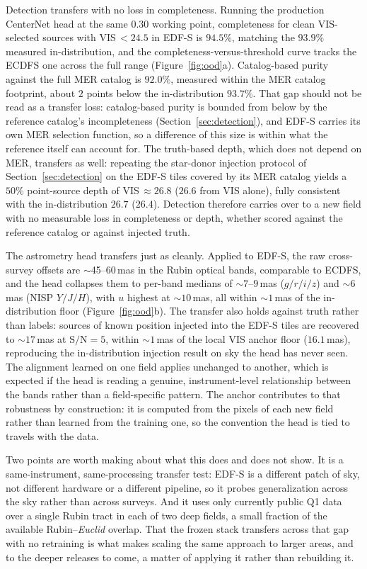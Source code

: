 \documentclass[twocolumn,linenumbers]{aastex701}
\begin{document}
Detection transfers with no loss in completeness. Running the production CenterNet head at the same $0.30$ working point, completeness for clean VIS-selected sources with VIS\,$<24.5$ in EDF-S is $94.5\%$, matching the $93.9\%$ measured in-distribution, and the completeness-versus-threshold curve tracks the ECDFS one across the full range (Figure~\ref{fig:ood}a). Catalog-based purity against the full MER catalog is $92.0\%$, measured within the MER catalog footprint, about $2$ points below the in-distribution $93.7\%$. That gap should not be read as a transfer loss: catalog-based purity is bounded from below by the reference catalog's incompleteness (Section~\ref{sec:detection}), and EDF-S carries its own MER selection function, so a difference of this size is within what the reference itself can account for. The truth-based depth, which does not depend on MER, transfers as well: repeating the star-donor injection protocol of Section~\ref{sec:detection} on the EDF-S tiles covered by its MER catalog yields a $50\%$ point-source depth of VIS\,${\approx}26.8$ ($26.6$ from VIS alone), fully consistent with the in-distribution $26.7$ ($26.4$). Detection therefore carries over to a new field with no measurable loss in completeness or depth, whether scored against the reference catalog or against injected truth.


The astrometry head transfers just as cleanly. Applied to EDF-S, the raw cross-survey offsets are $\sim$45--60\,mas in the Rubin optical bands, comparable to ECDFS, and the head collapses them to per-band medians of ${\sim}7$--$9$\,mas ($g/r/i/z$) and ${\sim}6$\,mas (NISP $Y\!/\!J\!/\!H$), with $u$ highest at ${\sim}10$\,mas, all within ${\sim}1$\,mas of the in-distribution floor (Figure~\ref{fig:ood}b). The transfer also holds against truth rather than labels: sources of known position injected into the EDF-S tiles are recovered to ${\sim}17$\,mas at $\mathrm{S/N}=5$, within ${\sim}1$\,mas of the local VIS anchor floor ($16.1$\,mas), reproducing the in-distribution injection result on sky the head has never seen. The alignment learned on one field applies unchanged to another, which is expected if the head is reading a genuine, instrument-level relationship between the bands rather than a field-specific pattern. The anchor contributes to that robustness by construction: it is computed from the pixels of each new field rather than learned from the training one, so the convention the head is tied to travels with the data.


Two points are worth making about what this does and does not show. It is a same-instrument, same-processing transfer test: EDF-S is a different patch of sky, not different hardware or a different pipeline, so it probes generalization across the sky rather than across surveys. And it uses only currently public Q1 data over a single Rubin tract in each of two deep fields, a small fraction of the available Rubin--\textit{Euclid} overlap. That the frozen stack transfers across that gap with no retraining is what makes scaling the same approach to larger areas, and to the deeper releases to come, a matter of applying it rather than rebuilding it.
\end{document}
